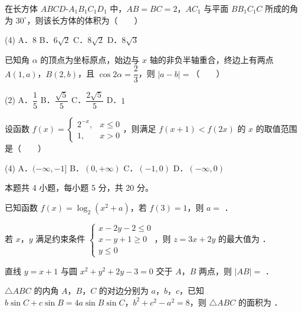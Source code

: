 在长方体 $ABCD\text{-}A_1B_1C_1D_1$ 中，$AB=BC=2$，$AC_1$ 与平面 $BB_1C_1C$ 所成的角为 $30^\circ$，则该长方体的体积为（　　）

\begin{gkopts}(4)
\task A．$8$
\task B．$6\sqrt2$
\task C．$8\sqrt2$
\task D．$8\sqrt3$
\end{gkopts}

已知角 $\alpha$ 的顶点为坐标原点，始边与 $x$ 轴的非负半轴重合，终边上有两点 $A(1,a)$，$B(2,b)$，且 $\cos2\alpha=\dfrac23$，则 $|a-b|=$（　　）

\begin{gkopts}(2)
\task A．$\dfrac15$
\task B．$\dfrac{\sqrt5}5$
\task C．$\dfrac{2\sqrt5}5$
\task D．$1$
\end{gkopts}

设函数 $f(x)=\begin{cases}2^{-x},&x\le0\\ 1,&x>0\end{cases}$，则满足 $f(x+1)<f(2x)$ 的 $x$ 的取值范围是（　　）

\begin{gkopts}(4)
\task A．$(-\infty,-1]$
\task B．$(0,+\infty)$
\task C．$(-1,0)$
\task D．$(-\infty,0)$
\end{gkopts}

\par\medskip


\begin{gktip}
本题共 4 小题，每小题 5 分，共 20 分。
\end{gktip}

已知函数 $f(x)=\log_2\left(x^{2}+a\right)$，若 $f(3)=1$，则 $a=$ \gkblank{}．

若 $x$，$y$ 满足约束条件 $\begin{cases}x-2y-2\le0\\ x-y+1\ge0\\ y\le0\end{cases}$，则 $z=3x+2y$ 的最大值为 \gkblank{}．

直线 $y=x+1$ 与圆 $x^{2}+y^{2}+2y-3=0$ 交于 $A$，$B$ 两点，则 $|AB|=$ \gkblank{}．

$\triangle ABC$ 的内角 $A$，$B$，$C$ 的对边分别为 $a$，$b$，$c$，已知 $b\sin C+c\sin B=4a\sin B\sin C$，$b^{2}+c^{2}-a^{2}=8$，则 $\triangle ABC$ 的面积为 \gkblank{}．

\par\medskip



